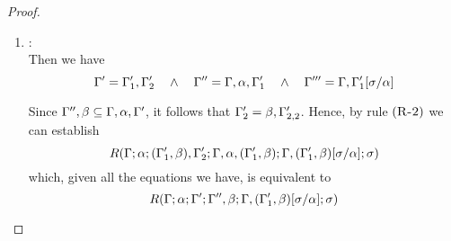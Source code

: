 \begin{proof}
\begin{description}
\begin{enumerate}
  \item {}: \\
   Then we have
\begin{equation*}
  \Gamma' = \Gamma_1',\Gamma_2' \quad\wedge\quad \Gamma'' = \Gamma,\alpha,\Gamma_1' \quad\wedge\quad
      \Gamma''' = \Gamma,\Gamma_1'[\sigma/\alpha]
\end{equation*}

  Since $\Gamma'',\beta \subseteq \Gamma,\alpha,\Gamma'$, it follows that $\Gamma_2' = \beta,\Gamma_{2,2}'$.
  Hence, by rule $\mbox{({\tt\sc R-2})}$ we can establish
\begin{equation*}
R(\Gamma;\alpha;(\Gamma_1',\beta),\Gamma_2';\Gamma,\alpha,(\Gamma_1',\beta);\Gamma,(\Gamma_1',\beta)[\sigma/\alpha];\sigma)
\end{equation*}
        which, given all the equations we have, is equivalent to
\begin{equation*}
R(\Gamma;\alpha;\Gamma';\Gamma'',\beta;\Gamma,(\Gamma_1',\beta)[\sigma/\alpha];\sigma)
\end{equation*}
  \end{enumerate}
\end{description}
\end{proof}

{\centering
{}}

